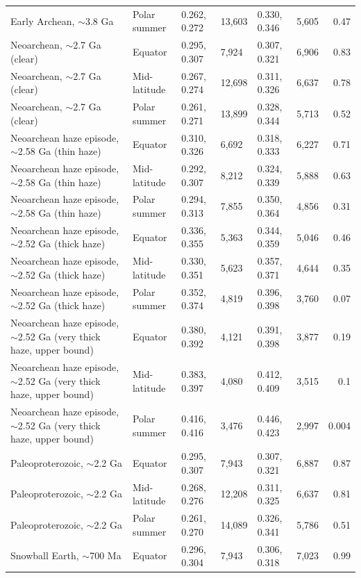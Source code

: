 \documentclass[9pt,twocolumn]{extarticle}
\begin{document}
\begin{longtable}{@{}llllllr@{}}
Early Archean, $\sim$3.8 Ga & Polar summer & 0.262, 0.272 & 13,603 & 0.330, 0.346 & 5,605 & 0.47 \\
Neoarchean, $\sim$2.7 Ga (clear) & Equator & 0.295, 0.307 & 7,924 & 0.307, 0.321 & 6,906 & 0.83 \\
Neoarchean, $\sim$2.7 Ga (clear) & Mid-latitude & 0.267, 0.274 & 12,698 & 0.311, 0.326 & 6,637 & 0.78 \\
Neoarchean, $\sim$2.7 Ga (clear) & Polar summer & 0.261, 0.271 & 13,899 & 0.328, 0.344 & 5,713 & 0.52 \\
Neoarchean haze episode, $\sim$2.58 Ga (thin haze) & Equator & 0.310, 0.326 & 6,692 & 0.318, 0.333 & 6,227 & 0.71 \\
Neoarchean haze episode, $\sim$2.58 Ga (thin haze) & Mid-latitude & 0.292, 0.307 & 8,212 & 0.324, 0.339 & 5,888 & 0.63 \\
Neoarchean haze episode, $\sim$2.58 Ga (thin haze) & Polar summer & 0.294, 0.313 & 7,855 & 0.350, 0.364 & 4,856 & 0.31 \\
Neoarchean haze episode, $\sim$2.52 Ga (thick haze) & Equator & 0.336, 0.355 & 5,363 & 0.344, 0.359 & 5,046 & 0.46 \\
Neoarchean haze episode, $\sim$2.52 Ga (thick haze) & Mid-latitude & 0.330, 0.351 & 5,623 & 0.357, 0.371 & 4,644 & 0.35 \\
Neoarchean haze episode, $\sim$2.52 Ga (thick haze) & Polar summer & 0.352, 0.374 & 4,819 & 0.396, 0.398 & 3,760 & 0.07 \\
Neoarchean haze episode, $\sim$2.52 Ga (very thick haze, upper bound) & Equator & 0.380, 0.392 & 4,121 & 0.391, 0.398 & 3,877 & 0.19 \\
Neoarchean haze episode, $\sim$2.52 Ga (very thick haze, upper bound) & Mid-latitude & 0.383, 0.397 & 4,080 & 0.412, 0.409 & 3,515 & 0.1 \\
Neoarchean haze episode, $\sim$2.52 Ga (very thick haze, upper bound) & Polar summer & 0.416, 0.416 & 3,476 & 0.446, 0.423 & 2,997 & 0.004 \\
Paleoproterozoic, $\sim$2.2 Ga & Equator & 0.295, 0.307 & 7,943 & 0.307, 0.321 & 6,887 & 0.87 \\
Paleoproterozoic, $\sim$2.2 Ga & Mid-latitude & 0.268, 0.276 & 12,208 & 0.311, 0.325 & 6,637 & 0.81 \\
Paleoproterozoic, $\sim$2.2 Ga & Polar summer & 0.261, 0.270 & 14,089 & 0.326, 0.341 & 5,786 & 0.51 \\
Snowball Earth, $\sim$700 Ma & Equator & 0.296, 0.304 & 7,943 & 0.306, 0.318 & 7,023 & 0.99 \\

\end{longtable}
\end{document}

